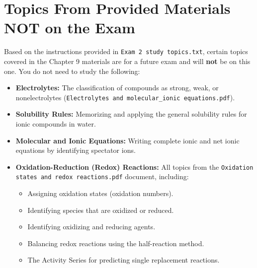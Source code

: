 \documentclass{article}
\begin{document}
\bigskip

\section*{Topics From Provided Materials NOT on the Exam}

Based on the instructions provided in \texttt{Exam 2 study topics.txt}, certain topics covered in the Chapter 9 materials are for a future exam and will \textbf{not} be on this one. You do not need to study the following:
\begin{itemize}[itemsep=5pt]
    \item \textbf{Electrolytes:} The classification of compounds as strong, weak, or nonelectrolytes (\texttt{Electrolytes and molecular\_ionic equations.pdf}).
    \item \textbf{Solubility Rules:} Memorizing and applying the general solubility rules for ionic compounds in water.
    \item \textbf{Molecular and Ionic Equations:} Writing complete ionic and net ionic equations by identifying spectator ions.
    \item \textbf{Oxidation-Reduction (Redox) Reactions:} All topics from the \texttt{Oxidation states and redox reactions.pdf} document, including:
    \begin{itemize}
        \item Assigning oxidation states (oxidation numbers).
        \item Identifying species that are oxidized or reduced.
        \item Identifying oxidizing and reducing agents.
        \item Balancing redox reactions using the half-reaction method.
        \item The Activity Series for predicting single replacement reactions.
    \end{itemize}
\end{itemize}


\newpage


\end{document}
